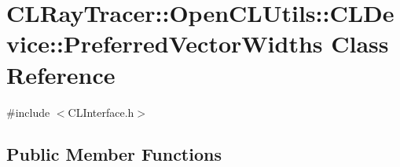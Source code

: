\hypertarget{class_c_l_ray_tracer_1_1_open_c_l_utils_1_1_c_l_device_1_1_preferred_vector_widths}{}\section{C\+L\+Ray\+Tracer\+:\+:Open\+C\+L\+Utils\+:\+:C\+L\+Device\+:\+:Preferred\+Vector\+Widths Class Reference}
\label{class_c_l_ray_tracer_1_1_open_c_l_utils_1_1_c_l_device_1_1_preferred_vector_widths}


{\ttfamily \#include $<$C\+L\+Interface.\+h$>$}

\subsection*{Public Member Functions}
